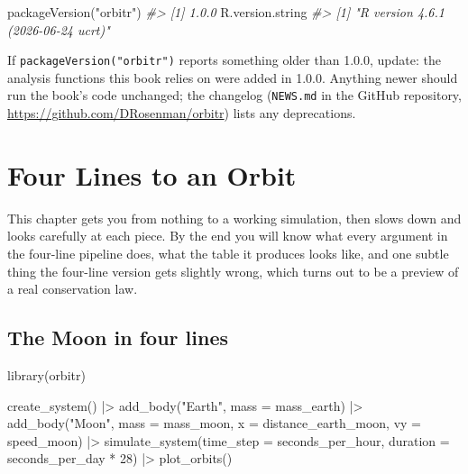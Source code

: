 \documentclass[
  10.5pt,
  letterpaper,
]{scrbook}
\newenvironment{Shaded}{\begin{snugshade}}{\end{snugshade}}
\newcommand{\AttributeTok}[1]{\textcolor[rgb]{0.00,0.00,0.00}{#1}}
\newcommand{\CommentTok}[1]{\textcolor[rgb]{0.00,0.00,0.00}{\textit{#1}}}
\newcommand{\DecValTok}[1]{\textcolor[rgb]{0.00,0.00,0.00}{#1}}
\newcommand{\FunctionTok}[1]{\textcolor[rgb]{0.00,0.00,0.00}{#1}}
\newcommand{\NormalTok}[1]{\textcolor[rgb]{0.00,0.00,0.00}{#1}}
\newcommand{\SpecialCharTok}[1]{\textcolor[rgb]{0.00,0.00,0.00}{#1}}
\newcommand{\StringTok}[1]{\textcolor[rgb]{0.00,0.00,0.00}{#1}}
\theoremstyle{plain}
\theoremstyle{remark}
\begin{document}
\begin{Shaded}
\begin{Highlighting}[]
\FunctionTok{packageVersion}\NormalTok{(}\StringTok{"orbitr"}\NormalTok{)}
\CommentTok{\#\textgreater{} [1] \textquotesingle{}1.0.0\textquotesingle{}}
\NormalTok{R.version.string}
\CommentTok{\#\textgreater{} [1] "R version 4.6.1 (2026{-}06{-}24 ucrt)"}
\end{Highlighting}
\end{Shaded}

If \texttt{packageVersion("orbitr")} reports something older than 1.0.0,
update: the analysis functions this book relies on were added in 1.0.0.
Anything newer should run the book's code unchanged; the changelog
(\texttt{NEWS.md} in the GitHub repository,
\url{https://github.com/DRosenman/orbitr}) lists any deprecations.

\chapter{Four Lines to an Orbit}\label{sec-four-lines}

This chapter gets you from nothing to a working simulation, then slows
down and looks carefully at each piece. By the end you will know what
every argument in the four-line pipeline does, what the table it
produces looks like, and one subtle thing the four-line version gets
slightly wrong, which turns out to be a preview of a real conservation
law.

\section{The Moon in four lines}\label{the-moon-in-four-lines}

\begin{Shaded}
\begin{Highlighting}[]
\FunctionTok{library}\NormalTok{(orbitr)}

\FunctionTok{create\_system}\NormalTok{() }\SpecialCharTok{|\textgreater{}}
  \FunctionTok{add\_body}\NormalTok{(}\StringTok{"Earth"}\NormalTok{, }\AttributeTok{mass =}\NormalTok{ mass\_earth) }\SpecialCharTok{|\textgreater{}}
  \FunctionTok{add\_body}\NormalTok{(}\StringTok{"Moon"}\NormalTok{, }\AttributeTok{mass =}\NormalTok{ mass\_moon, }\AttributeTok{x =}\NormalTok{ distance\_earth\_moon, }\AttributeTok{vy =}\NormalTok{ speed\_moon) }\SpecialCharTok{|\textgreater{}}
  \FunctionTok{simulate\_system}\NormalTok{(}\AttributeTok{time\_step =}\NormalTok{ seconds\_per\_hour, }\AttributeTok{duration =}\NormalTok{ seconds\_per\_day }\SpecialCharTok{*} \DecValTok{28}\NormalTok{) }\SpecialCharTok{|\textgreater{}}
  \FunctionTok{plot\_orbits}\NormalTok{()}
\end{Highlighting}
\end{Shaded}
\end{document}
